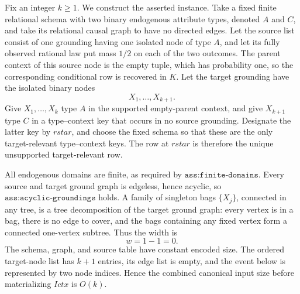 Fix an integer \(k\geq 1\).  We construct the asserted instance.  Take a fixed finite relational schema with two binary endogenous attribute types, denoted \(A\) and \(C\), and take its relational causal graph to have no directed edges.  Let the source list consist of one grounding having one isolated node of type \(A\), and let its fully observed rational law put mass \(1/2\) on each of the two outcomes.  The parent context of this source node is the empty tuple, which has probability one, so the corresponding conditional row is recovered in \(K\).  Let the target grounding have the isolated binary nodes
\[
X_1,\ldots,X_{k+1}.
\]
Give \(X_1,\ldots,X_k\) type \(A\) in the supported empty-parent context, and give \(X_{k+1}\) type \(C\) in a type--context key that occurs in no source grounding.  Designate the latter key by \(rstar\), and choose the fixed schema so that these are the only target-relevant type--context keys.  The row at \(rstar\) is therefore the unique unsupported target-relevant row.

All endogenous domains are finite, as required by \(\texttt{ass:finite-domains}\).  Every source and target ground graph is edgeless, hence acyclic, so \(\texttt{ass:acyclic-groundings}\) holds.  A family of singleton bags \(\{X_j\}\), connected in any tree, is a tree decomposition of the target ground graph: every vertex is in a bag, there is no edge to cover, and the bags containing any fixed vertex form a connected one-vertex subtree.  Thus the width is
\[
w=1-1=0.
\]
The schema, graph, and source table have constant encoded size.  The ordered target-node list has \(k+1\) entries, its edge list is empty, and the event below is represented by two node indices.  Hence the combined canonical input size before materializing \(Ictx\) is \(O(k)\).

